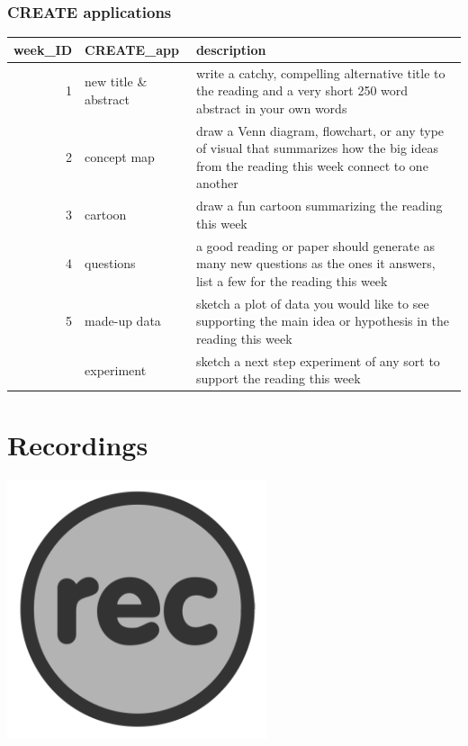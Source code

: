 \documentclass[
]{book}
\begin{document}
\hypertarget{create-applications}{%
\subsection*{CREATE applications}\label{create-applications}}

\begin{tabular}{rll}
\toprule
week\_ID & CREATE\_app & description\\
\midrule
1 & new title \& abstract & write a catchy, compelling alternative title to the reading and a very short 250 word abstract in your own words\\
2 & concept map & draw a Venn diagram, flowchart, or any type of visual that summarizes how the big ideas from the reading this week connect to one another\\
3 & cartoon & draw a fun cartoon summarizing the reading this week\\
4 & questions & a good reading or paper should generate as many new questions as the ones it answers, list a few for the reading this week\\
5 & made-up data & sketch a plot of data you would like to see supporting the main idea or hypothesis in the reading this week\\
\addlinespace
6 & experiment & sketch a next step experiment of any sort to support the reading this week\\
\bottomrule
\end{tabular}

\hypertarget{recordings}{%
\chapter{Recordings}\label{recordings}}

\includegraphics[width=3in,height=\textheight]{./rec.png}
\end{document}
